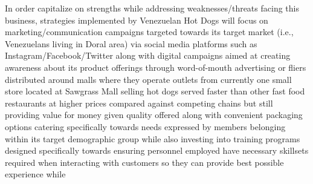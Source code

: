 In order capitalize on strengths while addressing weaknesses/threats facing this business, strategies implemented by Venezuelan Hot Dogs will focus on marketing/communication campaigns targeted towards its target market (i.e., Venezuelans living in Doral area) via social media platforms such as Instagram/Facebook/Twitter along with digital campaigns aimed at creating awareness about its product offerings through word-of-mouth advertising or fliers distributed around malls where they operate outlets from currently one small store located at Sawgrass Mall selling hot dogs served faster than other fast food restaurants at higher prices compared against competing chains but still providing value for money given quality offered along with convenient packaging options catering specifically towards needs expressed by members belonging within its target demographic group while also investing into training programs designed specifically towards ensuring personnel employed have necessary skillsets required when interacting with customers so they can provide best possible experience while